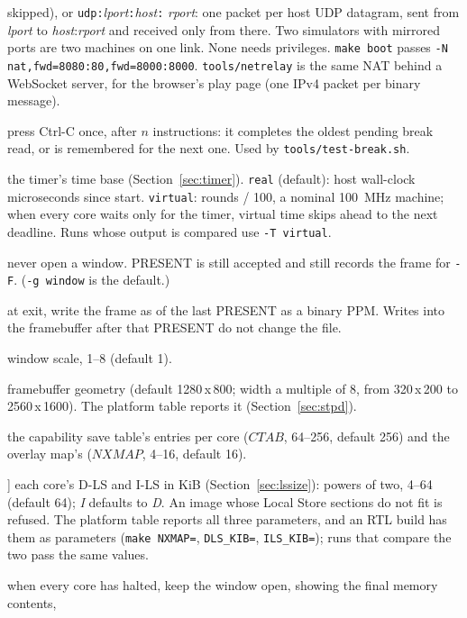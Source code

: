 \begin{description}[leftmargin=1em,style=nextline]
  skipped), or \texttt{udp:}\textit{lport}\texttt{:}\textit{host}\texttt{:}%
  \textit{rport}: one packet per host UDP datagram, sent from \textit{lport} to
  \textit{host}:\textit{rport} and received only from there. Two simulators with mirrored ports are
  two machines on one link. None needs privileges. \texttt{make boot} passes
  \texttt{-N nat,fwd=8080:80,fwd=8000:8000}. \texttt{tools/netrelay} is the same NAT behind a
  WebSocket server, for the browser's play page (one IPv4 packet per binary message).
\item[\texttt{-b n}] press Ctrl-C once, after $n$ instructions: it completes the oldest pending break
  read, or is remembered for the next one. Used by \texttt{tools/test-break.sh}.
\item[\texttt{-T real|virtual}] the timer's time base (Section~\ref{sec:timer}). \texttt{real}
  (default): host wall-clock microseconds since start. \texttt{virtual}: rounds / 100, a nominal
  100~MHz machine; when every core waits only for the timer, virtual time skips ahead to the next
  deadline. Runs whose output is compared use \texttt{-T virtual}.
\item[\texttt{-g none}] never open a window. PRESENT is still accepted and still records the frame
  for \texttt{-F}. (\texttt{-g window} is the default.)
\item[\texttt{-F file}] at exit, write the frame as of the last PRESENT as a binary PPM. Writes into the
  framebuffer after that PRESENT do not change the file.
\item[\texttt{-z n}] window scale, 1--8 (default 1).
\item[\texttt{-r W}x\texttt{H}] framebuffer geometry (default 1280\,x\,800; width a multiple of 8, from
  320\,x\,200 to 2560\,x\,1600). The platform table reports it (Section~\ref{sec:stpd}).
\item[\texttt{-S n}, \texttt{-X n}] the capability save table's entries per core ($\textit{CTAB}$,
  64--256, default 256) and the overlay map's ($\textit{NXMAP}$, 4--16, default 16).
\item[\texttt{-L} \textit{D}[\texttt{,}\textit{I}]] each core's D-LS and I-LS in KiB
  (Section~\ref{sec:lssize}): powers of two, 4--64 (default 64); \textit{I} defaults to \textit{D}. An
  image whose Local Store sections do not fit is refused. The platform table reports all three
  parameters, and an RTL build has them as parameters (\texttt{make NXMAP=}, \texttt{DLS\_KIB=},
  \texttt{ILS\_KIB=}); runs that compare the two pass the same values.
\item[\texttt{-H}] when every core has halted, keep the window open, showing the final memory contents,

\end{description}
